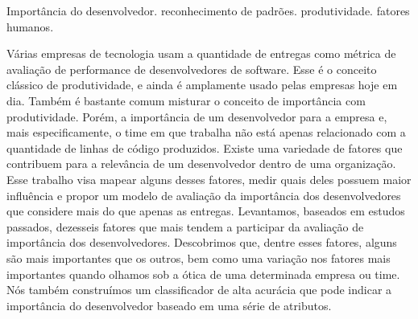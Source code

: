 \documentclass[dissertmst]{ppgco}
\begin{document}


\begin{resumo}{Importância do desenvolvedor. reconhecimento de padrões. produtividade. fatores humanos.}

 	 Várias empresas de tecnologia usam a quantidade de entregas como métrica de avaliação de performance de desenvolvedores de software. Esse é o conceito clássico de produtividade, e ainda é amplamente usado pelas empresas hoje em dia. Também é bastante comum misturar o conceito de importância com produtividade. Porém, a importância de um desenvolvedor para a empresa e, mais especificamente, o time em que trabalha não está apenas relacionado com a quantidade de linhas de código produzidos. Existe uma variedade de fatores que contribuem para a relevância de um desenvolvedor dentro de uma organização. Esse trabalho visa mapear alguns desses fatores, medir quais deles possuem maior influência e propor um modelo de avaliação da importância dos desenvolvedores que considere mais do que apenas as entregas. Levantamos, baseados em estudos passados, dezesseis fatores que mais tendem a participar da avaliação de importância dos desenvolvedores. Descobrimos que, dentre esses fatores, alguns são mais importantes que os outros, bem como uma variação nos fatores mais importantes quando olhamos sob a ótica de uma determinada empresa ou time. Nós também construímos um classificador de alta acurácia que pode indicar a importância do desenvolvedor baseado em uma série de atributos.
     
\end{resumo}
\end{document}
